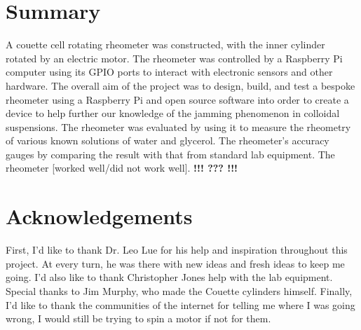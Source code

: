 \documentclass[twoside,a4]{report}
\def\shorttitle{Development of a Rheometer Controller}
\def\br{\newline \newline \noindent}
\def\cbh{\large\bfseries !!! ??? !!! \normalsize\normalfont}
\def\achapter{\shorttitle}  %
\begin{document}
	\chapter*{Summary} %
	\def\achapter{Summary}
	A couette cell rotating rheometer was constructed, with the inner cylinder rotated by an electric motor. The rheometer was controlled by a Raspberry Pi computer using its GPIO ports to interact with electronic sensors and other hardware. \br
	The overall aim of the project was to design, build, and test a bespoke rheometer using a Raspberry Pi and open source software into order to create a device to help further our knowledge of the jamming phenomenon in colloidal suspensions.\br
	The rheometer was evaluated by using it to measure the rheometry of various known solutions of water and glycerol. The rheometer's accuracy gauges by comparing the result with that from standard lab equipment. The rheometer [worked well/did not work well]. \cbh
	\newpage \begin{center} \large \space \normalsize \end{center}
	
	\newpage
	\def\achapter{Contents}
	\tableofcontents
	\newpage \begin{center} \large \space \normalsize \end{center}
	\chapter*{Acknowledgements}
	\def\achapter{Acknowledgements}
	First, I'd like to thank Dr. Leo Lue for his help and inspiration throughout this project. At every turn, he was there with new ideas and fresh ideas to keep me going. \br
	I'd also like to thank Christopher Jones help with the lab equipment. Special thanks to Jim Murphy, who made the Couette cylinders himself. \br
	Finally, I'd like to thank the communities of the internet for telling me where I was going wrong, I would still be trying to spin a motor if not for them.
	
	\newpage
	\setcounter{page}{1}
	
\end{document}
